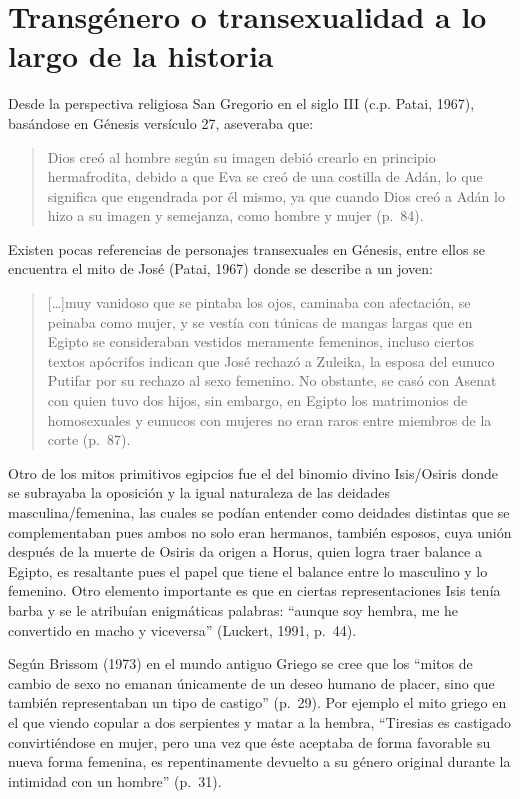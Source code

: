 \section{Transgénero o transexualidad a lo largo de la historia}
Desde la perspectiva religiosa San Gregorio en el siglo III (c.p.
Patai, 1967), basándose en Génesis versículo 27, aseveraba que:

\begin{quote}
    Dios creó al hombre según su imagen debió crearlo en principio hermafrodita,
    debido a que Eva se creó de una costilla de Adán, lo que significa que
    engendrada por él mismo, ya que cuando Dios creó a Adán lo hizo a su imagen y
    semejanza, como hombre y mujer (p.~84).
\end{quote}

Existen pocas referencias de personajes transexuales en Génesis, entre ellos
se encuentra el mito de José (Patai, 1967) donde se describe a un joven:

\begin{quote}
    […]muy vanidoso que se pintaba los ojos, caminaba con afectación, se peinaba como
    mujer, y se vestía con túnicas de mangas largas que en Egipto se consideraban
    vestidos meramente femeninos, incluso ciertos textos apócrifos indican que José
    rechazó a Zuleika, la esposa del eunuco Putifar por su rechazo al sexo femenino.
    No obstante, se casó con Asenat con quien tuvo dos hijos, sin embargo, en Egipto
    los matrimonios de homosexuales y eunucos con mujeres no eran raros entre
    miembros de la corte (p.~87).
\end{quote}

Otro de los mitos primitivos egipcios fue el del binomio divino Isis/Osiris
donde se subrayaba la oposición y la igual naturaleza de las deidades
masculina/femenina, las cuales se podían entender como deidades distintas que se
complementaban pues ambos no solo eran hermanos, también esposos, cuya unión
después de la muerte de Osiris da origen a Horus, quien logra traer balance a
Egipto, es resaltante pues el papel que tiene el balance entre lo masculino y lo
femenino.
Otro elemento importante es que en ciertas representaciones Isis tenía barba y
se le atribuían enigmáticas palabras: “aunque soy hembra, me he convertido en
macho y viceversa” (Luckert, 1991, p.~44).

Según Brissom (1973) en el mundo antiguo Griego se cree que los “mitos de cambio
de sexo no emanan únicamente de un deseo humano de placer, sino que también
representaban un tipo de castigo” (p.~29).
Por ejemplo el mito griego en el que viendo copular a dos serpientes y matar
a la hembra, “Tiresias es castigado convirtiéndose en mujer, pero una vez que
éste aceptaba de forma favorable su nueva forma femenina, es repentinamente
devuelto a su género original durante la intimidad con un hombre” (p.~31).

